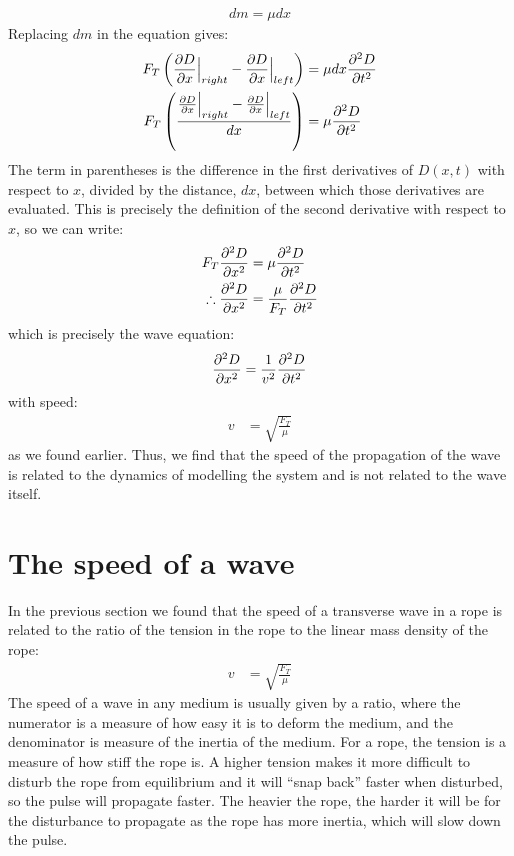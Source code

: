 \begin{align*}
dm = \mu dx
\end{align*}
Replacing $dm$ in the equation gives:
\begin{align*}
F_T\left(\frac{\partial D}{\partial x}\Bigr|_{right} - \frac{\partial D}{\partial x}\Bigr|_{left}\right) &= \mu dx \frac{\partial ^2D}{\partial t^2}\\
F_T\left(\frac{\frac{\partial D}{\partial x}\Bigr|_{right} - \frac{\partial D}{\partial x}\Bigr|_{left}}{dx}\right) &= \mu \frac{\partial ^2D}{\partial t^2}
\end{align*}
The term in parentheses is the difference in the first derivatives of $D(x,t)$ with respect to $x$, divided by the distance, $dx$, between which those derivatives are evaluated. This is precisely the definition of the second derivative with respect to $x$, so we can write:
\begin{align*}
F_T \frac{\partial ^2D}{\partial x^2} &= \mu \frac{\partial ^2D}{\partial t^2}\\
\therefore \frac{\partial ^2D}{\partial x^2} &= \frac{\mu}{F_T} \frac{\partial ^2D}{\partial t^2}\\
\end{align*}
which is precisely the wave equation:
\begin{align*}
\frac{\partial ^2D}{\partial x^2} &= \frac{1}{v^2} \frac{\partial ^2D}{\partial t^2}\\
\end{align*}
with speed:
\begin{align*}
v&= \sqrt{\frac{F_T}{\mu}}
\end{align*}
as we found earlier. Thus, we find that the speed of the propagation of the wave is related to the dynamics of modelling the system and is not related to the wave itself. 

\section{The speed of a wave}
In the previous section we found that the speed of a transverse wave in a rope is related to the ratio of the tension in the rope to the linear mass density of the rope:
\begin{align*}
v&= \sqrt{\frac{F_T}{\mu}}
\end{align*}
The speed of a wave in any medium is usually given by a ratio, where the numerator is a measure of how easy it is to deform the medium, and the denominator is measure of the inertia of the medium. For a rope, the tension is a measure of how stiff the rope is. A higher tension makes it more difficult to disturb the rope from equilibrium and it will ``snap back'' faster when disturbed, so the pulse will propagate faster. The heavier the rope, the harder it will be for the disturbance to propagate as the rope has more inertia, which will slow down the pulse.

